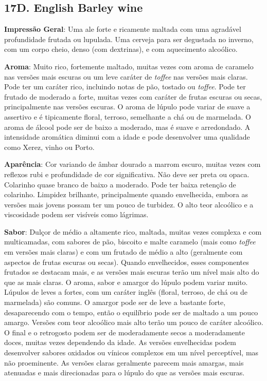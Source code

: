 \subsection*{17D. English Barley wine}
\textbf{Impressão Geral}: Uma ale forte e ricamente maltada com uma agradável profundidade frutada ou lupulada. Uma cerveja para ser degustada no inverno, com um corpo cheio, denso (com dextrinas), e com aquecimento alcoólico.

\textbf{Aroma}: Muito rico, fortemente maltado, muitas vezes com aroma de caramelo nas versões mais escuras ou um leve caráter de \textit{toffee} nas versões mais claras. Pode ter um caráter rico, incluindo notas de pão, tostado ou \textit{toffee}. Pode ter frutado de moderado a forte, muitas vezes com caráter de frutas escuras ou secas, principalmente nas versões escuras. O aroma de lúpulo pode variar de suave a assertivo e é tipicamente floral, terroso, semelhante a chá ou de marmelada. O aroma de álcool pode ser de baixo a moderado, mas é suave e arredondado. A intensidade aromática diminui com a idade e pode desenvolver uma qualidade como Xerez, vinho ou Porto.

\textbf{Aparência}: Cor variando de âmbar dourado a marrom escuro, muitas vezes com reflexos rubi e profundidade de cor significativa. Não deve ser preta ou opaca. Colarinho quase branco de baixo a moderado. Pode ter baixa retenção de colarinho. Limpidez brilhante, principalmente quando envelhecida, embora as versões mais jovens possam ter um pouco de turbidez. O alto teor alcoólico e a viscosidade podem ser visíveis como lágrimas.

\textbf{Sabor}: Dulçor de médio a altamente rico, maltada, muitas vezes complexa e com multicamadas, com sabores de pão, biscoito e malte caramelo (mais como \textit{toffee} em versões mais claras) e com um frutado de médio a alto (geralmente com aspectos de frutas escuras ou secas). Quando envelhecidos, esses componentes frutados se destacam mais, e as versões mais escuras terão um nível mais alto do que as mais claras. O aroma, sabor e amargor do lúpulo podem variar muito. Lúpulos de leves a fortes, com um caráter inglês (floral, terroso, de chá ou de marmelada) são comuns. O amargor pode ser de leve a bastante forte, desaparecendo com o tempo, então o equilíbrio pode ser de maltado a um pouco amargo. Versões com teor alcoólico mais alto terão um pouco de caráter alcoólico. O final e o retrogosto podem ser de moderadamente secos a moderadamente doces, muitas vezes dependendo da idade. As versões envelhecidas podem desenvolver sabores oxidados ou vínicos complexos em um nível perceptível, mas não proeminente. As versões claras geralmente parecem mais amargas, mais atenuadas e mais direcionadas para o lúpulo do que as versões mais escuras.

